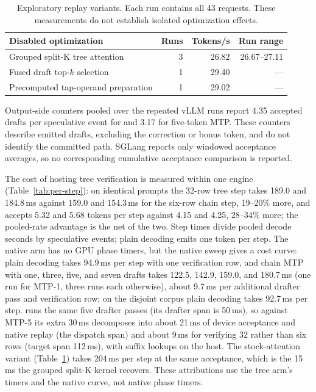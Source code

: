 \begin{table}[t]
\caption{Exploratory replay variants. Each run contains all 43 requests. These measurements do not establish isolated optimization effects.}
\label{tab:replay-variants}
\centering\small
\setlength{\tabcolsep}{3pt}
\begin{tabular}{@{}lrrr@{}}
\toprule
Disabled optimization & Runs & Tokens/s & Run range \\
\midrule
Grouped split-K tree attention & 3 & 26.82 & 26.67--27.11 \\
Fused draft top-$k$ selection & 1 & 29.40 & --- \\
Precomputed tap-operand preparation & 1 & 29.02 & --- \\
\bottomrule
\end{tabular}
\end{table}



Output-side counters pooled over the repeated vLLM runs report 4.35 accepted drafts per speculative event for \sys{} and 3.17 for five-token MTP. These counters describe emitted drafts, excluding the correction or bonus token, and do not identify the committed path. SGLang reports only windowed acceptance averages, so no corresponding cumulative acceptance comparison is reported.

The cost of hosting tree verification is measured within one engine (Table~\ref{tab:per-step}): on identical prompts the 32-row tree step takes 189.0 and 184.8\,ms against 159.0 and 154.3\,ms for the six-row chain step, 19--20\% more, and accepts 5.32 and 5.68 tokens per step against 4.15 and 4.25, 28--34\% more; the pooled-rate advantage is the net of the two. Step times divide pooled decode seconds by speculative events; plain decoding emits one token per step. The native arm has no GPU phase timers, but the native sweep gives a cost curve: plain decoding takes 94.9\,ms per step with one verification row, and chain MTP with one, three, five, and seven drafts takes 122.5, 142.9, 159.0, and 180.7\,ms (one run for MTP-1, three runs each otherwise), about 9.7\,ms per additional drafter pass and verification row; on the disjoint corpus plain decoding takes 92.7\,ms per step. \sys{} runs the same five drafter passes (its drafter span is 50\,ms), so against MTP-5 its extra 30\,ms decomposes into about 21\,ms of device acceptance and native replay (the dispatch span) and about 9\,ms for verifying 32 rather than six rows (target span 112\,ms), with suffix lookups on the host. The stock-attention variant (Table~\ref{tab:replay-variants}) takes 204\,ms per step at the same acceptance, which is the 15\,ms the grouped split-K kernel recovers. These attributions use the tree arm's timers and the native curve, not native phase timers.

